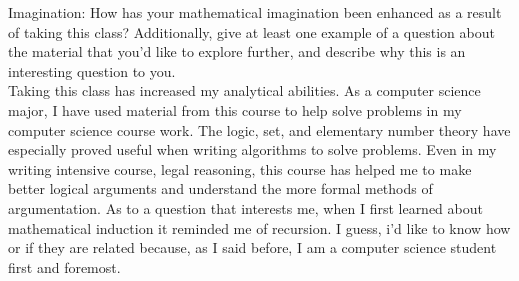 \documentclass[10pt]{article}
\newenvironment{question}[2][Question]{\begin{trivlist}
\item[\hskip \labelsep {\bfseries #1}\hskip \labelsep {\bfseries #2.}]}{\end{trivlist}}
\begin{document}
\begin{question}{10}
Imagination: How has your mathematical imagination been enhanced as a result of taking this class? Additionally, give at least one example of a question about the material that you’d like to explore further, and describe why this is an interesting question to you. \\ \indent
Taking this class has increased my analytical abilities. As a computer science major, I have used material from this course to help solve problems in my computer science course work. The logic, set, and elementary number theory have especially proved useful when writing algorithms to solve problems. Even in my writing intensive course, legal reasoning, this course has helped me to make better logical arguments and understand the more formal methods of argumentation. As to a question that interests me, when I first learned about mathematical induction it reminded me of recursion. I guess, i'd like to know how or if they are related because, as I said before, I am a computer science student first and foremost.
\end{question}

\end{document}
